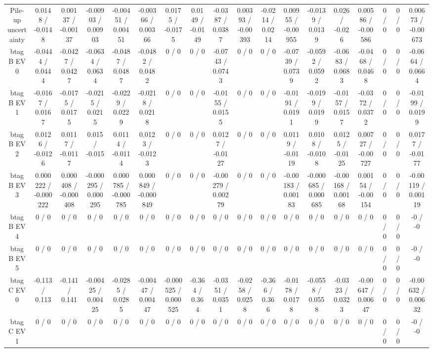 \documentclass[10pt]{article}
\begin{document}
\begin{table}[htbp]
\begin{center}
\begin{tabular}{|c|c|c|c|c|c|c|c|c|c|c|c|c|c|c|c|c|c|}
  Pile-up uncertainty & 0.0148 / -0.0148 & 0.00137 / -0.00137 & -0.00903 / 0.00903 & -0.00451 / 0.00451 & -0.00366 / 0.00366 & 0.0175 / -0.0175 & 0.0149 / -0.0149 & -0.0387 / 0.0387 & 0.00393 / -0.00393 & -0.0214 / 0.0214 & 0.00955 / -0.00955 & -0.0139 / 0.0139 & 0.026 / -0.026 & 0.00586 / -0.00586 & 0 / 0 & 0 / 0 & 0.00673 / -0.00673 \\ 
  btag B EV 0 & -0.0444 / 0.0444 & -0.0427 / 0.0427 & -0.0634 / 0.0634 & -0.0487 / 0.0487 & -0.0482 / 0.0482 & 0 / 0 & 0 / 0 & -0.0743 / 0.0743 & 0 / 0 & 0 / 0 & -0.0739 / 0.0739 & -0.0592 / 0.0592 & -0.0683 / 0.0683 & -0.0468 / 0.0468 & 0 / 0 & 0 / 0 & -0.0664 / 0.0664 \\ 
  btag B EV 1 & -0.0167 / 0.0167 & -0.0175 / 0.0175 & -0.0215 / 0.0215 & -0.0229 / 0.0229 & -0.0218 / 0.0218 & 0 / 0 & 0 / 0 & -0.0155 / 0.0155 & 0 / 0 & 0 / 0 & -0.0191 / 0.0191 & -0.0199 / 0.0199 & -0.0157 / 0.0157 & -0.0372 / 0.0372 & 0 / 0 & 0 / 0 & -0.0199 / 0.0199 \\ 
  btag B EV 2 & 0.0126 / -0.0126 & 0.0117 / -0.0117 & 0.015 / -0.015 & 0.0114 / -0.0114 & 0.0123 / -0.0123 & 0 / 0 & 0 / 0 & 0.0127 / -0.0127 & 0 / 0 & 0 / 0 & 0.0119 / -0.0119 & 0.0108 / -0.0108 & 0.0125 / -0.0125 & 0.00727 / -0.00727 & 0 / 0 & 0 / 0 & 0.0177 / -0.0177 \\ 
  btag B EV 3 & 0.000222 / -0.000222 & 0.000408 / -0.000408 & -0.000295 / 0.000295 & 0.000785 / -0.000785 & 0.000849 / -0.000849 & 0 / 0 & 0 / 0 & -0.00279 / 0.00279 & 0 / 0 & 0 / 0 & -0.00183 / 0.00183 & -0.000685 / 0.000685 & -0.00168 / 0.00168 & 0.00154 / -0.00154 & 0 / 0 & 0 / 0 & -0.00119 / 0.00119 \\ 
  btag B EV 4 & 0 / 0 & 0 / 0 & 0 / 0 & 0 / 0 & 0 / 0 & 0 / 0 & 0 / 0 & 0 / 0 & 0 / 0 & 0 / 0 & 0 / 0 & 0 / 0 & 0 / 0 & 0 / 0 & 0 / 0 & 0 / 0 & -0 / -0 \\ 
  btag B EV 5 & 0 / 0 & 0 / 0 & 0 / 0 & 0 / 0 & 0 / 0 & 0 / 0 & 0 / 0 & 0 / 0 & 0 / 0 & 0 / 0 & 0 / 0 & 0 / 0 & 0 / 0 & 0 / 0 & 0 / 0 & 0 / 0 & -0 / -0 \\ 
  btag C EV 0 & -0.113 / 0.113 & -0.141 / 0.141 & -0.00425 / 0.00425 & -0.0285 / 0.0285 & -0.00447 / 0.00447 & -0.000525 / 0.000525 & -0.364 / 0.364 & -0.0351 / 0.0351 & -0.0258 / 0.0258 & -0.366 / 0.366 & -0.0178 / 0.0178 & -0.0558 / 0.0558 & -0.0323 / 0.0323 & -0.00647 / 0.00647 & 0 / 0 & 0 / 0 & -0.00632 / 0.00632 \\ 
  btag C EV 1 & 0 / 0 & 0 / 0 & 0 / 0 & 0 / 0 & 0 / 0 & 0 / 0 & 0 / 0 & 0 / 0 & 0 / 0 & 0 / 0 & 0 / 0 & 0 / 0 & 0 / 0 & 0 / 0 & 0 / 0 & 0 / 0 & -0 / -0 \\ 

\end{tabular}
\end{center}
\end{table}
\end{document}
